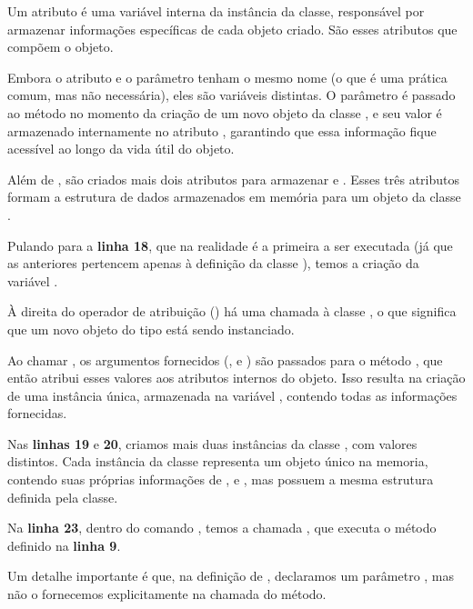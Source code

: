 Um atributo é uma variável interna da instância da classe, responsável por armazenar informações específicas de cada
objeto criado.
São esses atributos que compõem o objeto.

Embora o atributo e o parâmetro tenham o mesmo nome (o que é uma prática comum, mas não necessária), eles são variáveis
distintas.
O parâmetro  é passado ao método  no momento da criação de um novo objeto da classe
, e seu valor é armazenado internamente no atributo , garantindo que essa
informação fique acessível ao longo da vida útil do objeto.

Além de , são criados mais dois atributos para armazenar  e .
Esses três atributos formam a estrutura de dados armazenados em memória para um objeto da classe .


Pulando para a \textbf{linha 18}, que na realidade é a primeira a ser executada (já que as anteriores pertencem apenas
à definição da classe ), temos a criação da variável .

À direita do operador de atribuição (\inlcode{=}) há uma chamada à classe , o que significa que um
novo objeto do tipo  está sendo instanciado.

Ao chamar , os argumentos
fornecidos (,  e ) são passados para o método , que
então atribui esses valores aos atributos internos do objeto.
Isso resulta na criação de uma instância única, armazenada na variável , contendo todas as
informações fornecidas.

Nas \textbf{linhas 19} e \textbf{20}, criamos mais duas instâncias da classe , com valores distintos.
Cada instância da classe representa um objeto único na memoria, contendo suas próprias informações
de ,  e , mas possuem a mesma estrutura definida pela classe.

Na \textbf{linha 23}, dentro do comando , temos a chamada  , que executa o
método  definido na \textbf{linha 9}.

Um detalhe importante é que, na definição de \inlcode{)}, declaramos um parâmetro
, mas não o fornecemos explicitamente na chamada do método.

